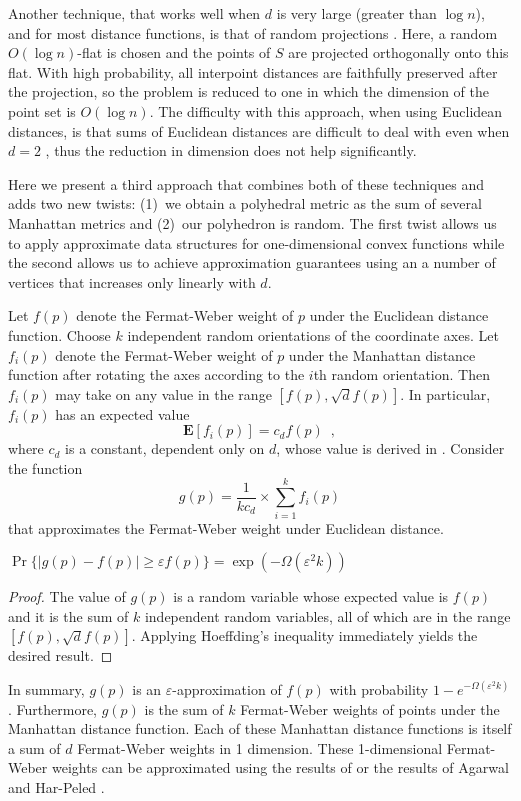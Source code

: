 \documentclass[charterfonts,lotsofwhite]{patmorin}
\newcommand{\eps}{\varepsilon}
\newcommand{\E}{\mathbf{E}}
\begin{document}
Another technique, that works well when $d$ is very large (greater
than $\log n$), and for most distance functions, is that of random
projections \cite{i01}. Here, a random $O(\log n)$-flat is chosen and
the points of $S$ are projected orthogonally onto this flat.  With
high probability, all interpoint distances are faithfully preserved
after the projection, so the problem is reduced to one in which the
dimension of the point set is $O(\log n)$.  The difficulty with this
approach, when using Euclidean distances, is that sums of Euclidean
distances are difficult to deal with even when $d=2$ \cite{b88}, thus
the reduction in dimension does not help significantly.

Here we present a third approach that combines both of these
techniques and adds two new twists: (1)~we obtain a polyhedral metric
as the sum of several Manhattan metrics and (2)~our polyhedron is
random.  The first twist allows us to apply approximate data
structures for one-dimensional convex functions while the second
allows us to achieve approximation guarantees using an a number of
vertices that increases only linearly with $d$.

Let $f(p)$ denote the Fermat-Weber weight of $p$ under the Euclidean
distance function.  Choose $k$ independent random orientations of the
coordinate axes.  Let $f_i(p)$ denote the Fermat-Weber weight of $p$
under the Manhattan distance function after rotating the axes
according to the $i$th random orientation.  Then $f_i(p)$ may take on
any value in the range $[f(p),\sqrt df(p)]$.  In particular, $f_i(p)$
has an expected value 
\[
   \E[f_i(p)]=c_df(p) \enspace ,
\]
where $c_d$ is a constant, dependent only on $d$, whose value is
derived in .  Consider the function
\[
  g(p) = \frac{1}{kc_d}\times\sum_{i=1}^k f_i(p) 
\]
that approximates the Fermat-Weber weight under Euclidean distance.

\begin{lem}
$\Pr\{|g(p)-f(p)| \ge \eps f(p)\} = \exp(-\Omega(\eps^2k))$
\end{lem}

\begin{proof}
The value of $g(p)$ is a random variable whose expected value is
$f(p)$ and it is the sum of $k$ independent random variables, all of
which are in the range $[f(p),\sqrt d f(p)]$.  Applying Hoeffding's
inequality \cite{h63} immediately yields the desired result.
\end{proof}

In summary, $g(p)$ is an $\eps$-approximation of $f(p)$ with
probability $1-e^{-\Omega(\eps^2k)}$.  Furthermore, $g(p)$ is the sum
of $k$ Fermat-Weber weights of points under the Manhattan distance
function.  Each of these Manhattan distance functions is itself a sum
of $d$ Fermat-Weber weights in 1 dimension.  These 1-dimensional
Fermat-Weber weights can be approximated using the results of
 or the results of Agarwal and Har-Peled \cite{ah01}.
\end{document}
